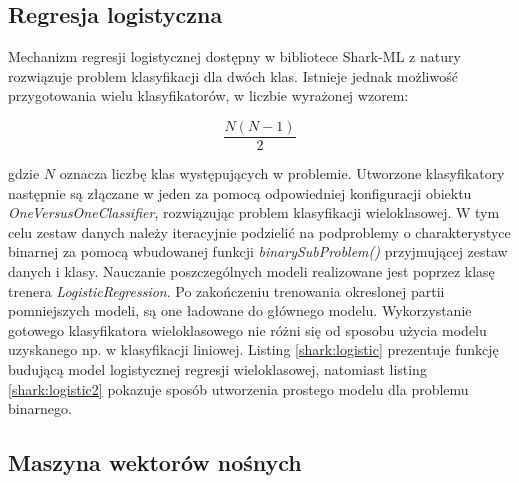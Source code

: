 

\subsection{Regresja logistyczna}

Mechanizm regresji logistycznej dostępny w bibliotece Shark-ML z natury rozwiązuje problem klasyfikacji dla dwóch klas. Istnieje jednak możliwość przygotowania wielu klasyfikatorów, w liczbie wyrażonej wzorem:

\begin{equation}
	\frac{N(N-1)}{2}	
	\label{multiclass}
\end{equation}

gdzie $N$ oznacza liczbę klas występujących w problemie. Utworzone klasyfikatory następnie są złączane w jeden za pomocą odpowiedniej konfiguracji obiektu \textit{OneVersusOneClassifier}, rozwiązując problem klasyfikacji wieloklasowej. W tym celu zestaw danych należy iteracyjnie podzielić na podproblemy o charakterystyce binarnej za pomocą wbudowanej funkcji \textit{binarySubProblem()} przyjmującej zestaw danych i klasy. Nauczanie poszczególnych modeli realizowane jest poprzez klasę trenera \textit{LogisticRegression}. Po zakończeniu trenowania okreslonej partii pomniejszych modeli, są one ładowane do głównego modelu. Wykorzystanie gotowego klasyfikatora wieloklasowego nie różni się od sposobu użycia modelu uzyskanego np. w klasyfikacji liniowej. Listing \ref{shark:logistic} prezentuje funkcję budującą model logistycznej regresji wieloklasowej, natomiast listing \ref{shark:logistic2} pokazuje sposób utworzenia prostego modelu dla problemu binarnego.



\subsection{Maszyna wektorów nośnych}

